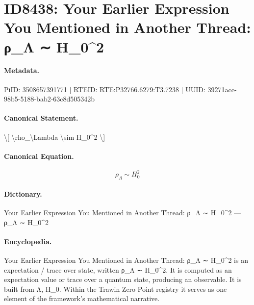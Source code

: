 \section*{ID8438: Your Earlier Expression You Mentioned in Another Thread: ρ\_Λ ∼ H\_0\textasciicircum{}2}
\paragraph{Metadata.}
PiID: 3508657391771 | RTEID: RTE:P32766.6279:T3.7238 | UUID: 39271acc-98b5-5188-bab2-63c8d505342b

\paragraph{Canonical Statement.}
\textbackslash{}[ \textbackslash{}rho\_\textbackslash{}Lambda \textbackslash{}sim H\_0\textasciicircum{}2 \textbackslash{}]

\paragraph{Canonical Equation.}
\[
\rho_\Lambda \sim H_0^2
\]

\paragraph{Dictionary.}
Your Earlier Expression You Mentioned in Another Thread: ρ\_Λ ∼ H\_0\textasciicircum{}2 — ρ\_Λ ∼ H\_0\textasciicircum{}2

\paragraph{Encyclopedia.}
Your Earlier Expression You Mentioned in Another Thread: ρ\_Λ ∼ H\_0\textasciicircum{}2 is an expectation / trace over state, written ρ\_Λ ∼ H\_0\textasciicircum{}2. It is computed as an expectation value or trace over a quantum state, producing an observable. It is built from Λ, H\_0. Within the Trawin Zero Point registry it serves as one element of the framework's mathematical narrative.
